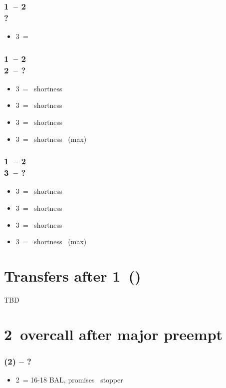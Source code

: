 \subsubsection*{1\spades\ -- 2\nt \\ ?}
\begin{itemize}
    \item 3\clubs\ = \lsf
\end{itemize}

\subsubsection*{1\hearts\ -- 2\spades \\ 2\nt\ -- ?}
\begin{itemize}
    \item 3\clubs\ = \clubs\ shortness
    \item 3\diams\ = \diams\ shortness
    \item 3\hearts\ = \spades\ shortness
    \item 3\spades\ = \spades\ shortness \gf\ (max)
\end{itemize}

\subsubsection*{1\spades\ -- 2\nt \\ 3\clubs\ -- ?}
\begin{itemize}
    \item 3\diams\ = \clubs\ shortness
    \item 3\hearts\ = \diams\ shortness
    \item 3\spades\ = \hearts\ shortness
    \item 3\nt\ = \hearts\ shortness \gf\ (max)
\end{itemize}

\section{\texorpdfstring{Transfers after 1\majs\ (\dbl)}{Transfers1MX}}\label{sec:Transfers1MX}

TBD

\section{\texorpdfstring{2\ntx\ overcall after major preempt}{preempt2nt}}\label{sec:preempt2nt}

\subsubsection*{(2\majs) -- ?}
\begin{itemize}
    \item 2\nt\ = 16-18 BAL, promises \majs\ stopper
\end{itemize}

